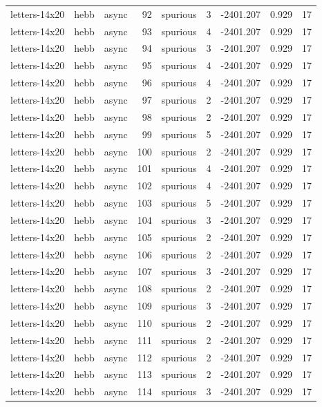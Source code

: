 \begin{tabular}{lllrlrrrr}
letters-14x20 & hebb & async & 92 & spurious & 3 & -2401.207 & 0.929 & 17 \\
letters-14x20 & hebb & async & 93 & spurious & 4 & -2401.207 & 0.929 & 17 \\
letters-14x20 & hebb & async & 94 & spurious & 3 & -2401.207 & 0.929 & 17 \\
letters-14x20 & hebb & async & 95 & spurious & 4 & -2401.207 & 0.929 & 17 \\
letters-14x20 & hebb & async & 96 & spurious & 4 & -2401.207 & 0.929 & 17 \\
letters-14x20 & hebb & async & 97 & spurious & 2 & -2401.207 & 0.929 & 17 \\
letters-14x20 & hebb & async & 98 & spurious & 2 & -2401.207 & 0.929 & 17 \\
letters-14x20 & hebb & async & 99 & spurious & 5 & -2401.207 & 0.929 & 17 \\
letters-14x20 & hebb & async & 100 & spurious & 2 & -2401.207 & 0.929 & 17 \\
letters-14x20 & hebb & async & 101 & spurious & 4 & -2401.207 & 0.929 & 17 \\
letters-14x20 & hebb & async & 102 & spurious & 4 & -2401.207 & 0.929 & 17 \\
letters-14x20 & hebb & async & 103 & spurious & 5 & -2401.207 & 0.929 & 17 \\
letters-14x20 & hebb & async & 104 & spurious & 3 & -2401.207 & 0.929 & 17 \\
letters-14x20 & hebb & async & 105 & spurious & 2 & -2401.207 & 0.929 & 17 \\
letters-14x20 & hebb & async & 106 & spurious & 2 & -2401.207 & 0.929 & 17 \\
letters-14x20 & hebb & async & 107 & spurious & 3 & -2401.207 & 0.929 & 17 \\
letters-14x20 & hebb & async & 108 & spurious & 2 & -2401.207 & 0.929 & 17 \\
letters-14x20 & hebb & async & 109 & spurious & 3 & -2401.207 & 0.929 & 17 \\
letters-14x20 & hebb & async & 110 & spurious & 2 & -2401.207 & 0.929 & 17 \\
letters-14x20 & hebb & async & 111 & spurious & 2 & -2401.207 & 0.929 & 17 \\
letters-14x20 & hebb & async & 112 & spurious & 2 & -2401.207 & 0.929 & 17 \\
letters-14x20 & hebb & async & 113 & spurious & 2 & -2401.207 & 0.929 & 17 \\
letters-14x20 & hebb & async & 114 & spurious & 3 & -2401.207 & 0.929 & 17 \\

\end{tabular}
